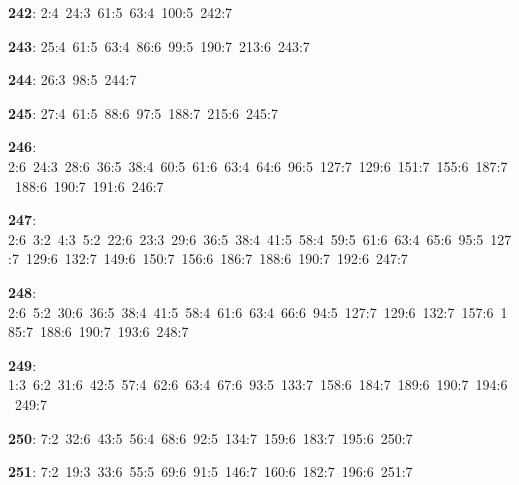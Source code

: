 \noindent \textbf{242}: 2:4\allowbreak\ 24:3\allowbreak\ 61:5\allowbreak\ 63:4\allowbreak\ 100:5\allowbreak\ 242:7\par
\noindent \textbf{243}: 25:4\allowbreak\ 61:5\allowbreak\ 63:4\allowbreak\ 86:6\allowbreak\ 99:5\allowbreak\ 190:7\allowbreak\ 213:6\allowbreak\ 243:7\par
\noindent \textbf{244}: 26:3\allowbreak\ 98:5\allowbreak\ 244:7\par
\noindent \textbf{245}: 27:4\allowbreak\ 61:5\allowbreak\ 88:6\allowbreak\ 97:5\allowbreak\ 188:7\allowbreak\ 215:6\allowbreak\ 245:7\par
\noindent \textbf{246}: 2:6\allowbreak\ 24:3\allowbreak\ 28:6\allowbreak\ 36:5\allowbreak\ 38:4\allowbreak\ 60:5\allowbreak\ 61:6\allowbreak\ 63:4\allowbreak\ 64:6\allowbreak\ 96:5\allowbreak\ 127:7\allowbreak\ 129:6\allowbreak\ 151:7\allowbreak\ 155:6\allowbreak\ 187:7\allowbreak\ 188:6\allowbreak\ 190:7\allowbreak\ 191:6\allowbreak\ 246:7\par
\noindent \textbf{247}: 2:6\allowbreak\ 3:2\allowbreak\ 4:3\allowbreak\ 5:2\allowbreak\ 22:6\allowbreak\ 23:3\allowbreak\ 29:6\allowbreak\ 36:5\allowbreak\ 38:4\allowbreak\ 41:5\allowbreak\ 58:4\allowbreak\ 59:5\allowbreak\ 61:6\allowbreak\ 63:4\allowbreak\ 65:6\allowbreak\ 95:5\allowbreak\ 127:7\allowbreak\ 129:6\allowbreak\ 132:7\allowbreak\ 149:6\allowbreak\ 150:7\allowbreak\ 156:6\allowbreak\ 186:7\allowbreak\ 188:6\allowbreak\ 190:7\allowbreak\ 192:6\allowbreak\ 247:7\par
\noindent \textbf{248}: 2:6\allowbreak\ 5:2\allowbreak\ 30:6\allowbreak\ 36:5\allowbreak\ 38:4\allowbreak\ 41:5\allowbreak\ 58:4\allowbreak\ 61:6\allowbreak\ 63:4\allowbreak\ 66:6\allowbreak\ 94:5\allowbreak\ 127:7\allowbreak\ 129:6\allowbreak\ 132:7\allowbreak\ 157:6\allowbreak\ 185:7\allowbreak\ 188:6\allowbreak\ 190:7\allowbreak\ 193:6\allowbreak\ 248:7\par
\noindent \textbf{249}: 1:3\allowbreak\ 6:2\allowbreak\ 31:6\allowbreak\ 42:5\allowbreak\ 57:4\allowbreak\ 62:6\allowbreak\ 63:4\allowbreak\ 67:6\allowbreak\ 93:5\allowbreak\ 133:7\allowbreak\ 158:6\allowbreak\ 184:7\allowbreak\ 189:6\allowbreak\ 190:7\allowbreak\ 194:6\allowbreak\ 249:7\par
\noindent \textbf{250}: 7:2\allowbreak\ 32:6\allowbreak\ 43:5\allowbreak\ 56:4\allowbreak\ 68:6\allowbreak\ 92:5\allowbreak\ 134:7\allowbreak\ 159:6\allowbreak\ 183:7\allowbreak\ 195:6\allowbreak\ 250:7\par
\noindent \textbf{251}: 7:2\allowbreak\ 19:3\allowbreak\ 33:6\allowbreak\ 55:5\allowbreak\ 69:6\allowbreak\ 91:5\allowbreak\ 146:7\allowbreak\ 160:6\allowbreak\ 182:7\allowbreak\ 196:6\allowbreak\ 251:7\par
